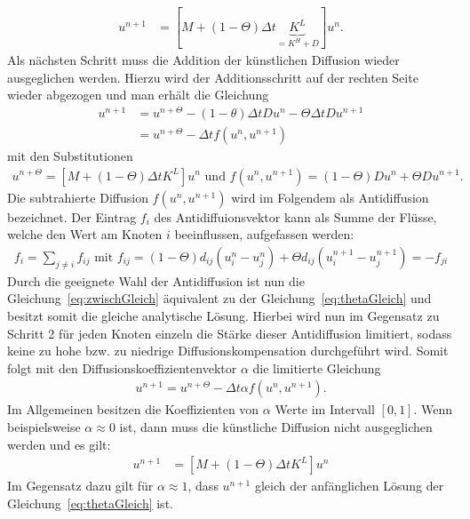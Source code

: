 \documentclass[12pt,titlepage]{article}
\begin{document}
\begin{align}
 [M-\Theta\Delta t\underbrace{K^L}_{\scriptscriptstyle=K^H+D}]u^{n+1}&=[M+(1-\Theta)\Delta t\underbrace{K^L}_{\scriptscriptstyle=K^H+D}]u^n.\nonumber
\end{align}
Als nächsten Schritt muss die Addition der künstlichen Diffusion wieder ausgeglichen werden. Hierzu wird der Additionsschritt auf der rechten Seite wieder abgezogen und man erhält die Gleichung
\begin{align}
 [M-\Theta\Delta tK^L]u^{n+1}&=u^{n+\Theta} -(1-\theta)\Delta tDu^n-\Theta\Delta tDu^{n+1}\nonumber\\
 &=u^{n+\Theta}-\Delta tf(u^n,u^{n+1})\label{eq:zwischGleich}
\end{align}
mit den Substitutionen
\begin{align}
 u^{n+\Theta}=[M+(1-\Theta)\Delta tK^L]u^n \text{ und } f(u^n,u^{n+1})=(1-\Theta)Du^n+\Theta Du^{n+1}.\nonumber
\end{align}
Die subtrahierte Diffusion $f(u^n,u^{n+1})$ wird im Folgendem als Antidiffusion bezeichnet. Der Eintrag $f_i$ des Antidiffuionsvektor kann als Summe der Flüsse, welche den Wert am Knoten $i$ beeinflussen, aufgefassen werden:
\begin{align}
 f_i=\sum\limits_{j\neq i}f_{ij}\text{ mit }f_{ij}=(1-\Theta)d_{ij}(u_i^n-u_j^n)+\Theta d_{ij}(u_i^{n+1}-u_j^{n+1})=-f_{ji}\nonumber
\end{align}
Durch die geeignete Wahl der Antidiffusion ist nun die Gleichung~\eqref{eq:zwischGleich} äquivalent zu der Gleichung~\eqref{eq:thetaGleich} und besitzt somit die gleiche analytische Lösung. Hierbei wird nun im Gegensatz zu Schritt 2 für jeden Knoten einzeln die Stärke dieser Antidiffusion limitiert, sodass keine zu hohe bzw. zu niedrige Diffusionskompensation durchgeführt wird. Somit folgt mit den Diffusionskoeffizientenvektor $\alpha$ die limitierte Gleichung
\begin{align}
  [M-\Theta\Delta tK^L]u^{n+1}=u^{n+\Theta}-\Delta t\alpha f(u^n,u^{n+1}).\label{eq:alphaGleich}
\end{align}
Im Allgemeinen besitzen die Koeffizienten von $\alpha$ Werte im Intervall $[0,1]$. Wenn beispielsweise $\alpha\approx0$ ist, dann muss die künstliche Diffusion nicht ausgeglichen werden und es gilt:
\begin{align}
 [M-\Theta\Delta tK^L]u^{n+1}&=[M+(1-\Theta)\Delta tK^L]u^n\nonumber
\end{align}
Im Gegensatz dazu gilt für $\alpha\approx1$, dass $u^{n+1}$ gleich der anfänglichen Lösung der Gleichung~\eqref{eq:thetaGleich} ist.\\
\end{document}
